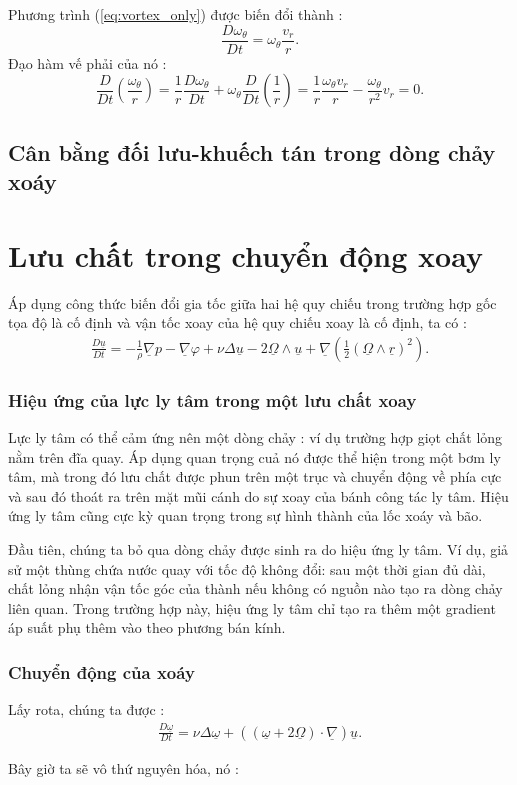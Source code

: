 \documentclass[CO_LUU_CHAT.tex]{subfiles}
\begin{document}
Phương trình (\ref{eq:vortex_only}) được biến đổi thành :
$$
\frac{D\omega_\theta}{Dt}=\omega_\theta\frac{v_r}{r}.
$$
Đạo hàm vế phải của nó :
$$
\frac{D}{Dt}\left(\frac{\omega_\theta}{r}\right)=\frac{1}{r}\frac{D\omega_\theta}{Dt}+\omega_\theta\frac{D}{Dt}\left(\frac{1}{r}\right)=\frac{1}{r}\frac{\omega_\theta v_r}{r}-\frac{\omega_\theta}{r^2}v_r=0.
$$

\subsection{Cân bằng đối lưu-khuếch tán trong dòng chảy xoáy}


\section{Lưu chất trong chuyển động xoay}
	Áp dụng công thức biến đổi gia tốc giữa hai hệ quy chiếu trong trường hợp gốc tọa độ là cố định và vận tốc xoay của hệ quy chiếu xoay là cố định, ta có :
		\begin{equation}
			\begin{aligned}
				\frac{D\underline{u}}{Dt}=-\frac{1}{\rho}\underline{\nabla}p-\underline{\nabla}\varphi+\nu\Delta\underline{u}-2\underline{\Omega}\wedge\underline{u}+\underline{\nabla}\left(\frac{1}{2}\left(\underline{\Omega}\wedge\underline{r}\right)^2\right).
			\end{aligned}
		\end{equation}

\subsubsection{Hiệu ứng của lực ly tâm trong một lưu chất xoay}

	Lực ly tâm có thể cảm ứng nên một dòng chảy : ví dụ trường hợp giọt chất lỏng nằm trên đĩa quay. Áp dụng quan trọng cuả nó được thể hiện trong một bơm ly tâm, mà trong đó lưu chất được phun trên một trục và chuyển động về phía cực và sau đó thoát ra trên mặt mũi cánh do sự xoay của bánh công tác ly tâm. Hiệu ứng ly tâm cũng cực kỳ quan trọng trong sự hình thành của lốc xoáy và bão.

	Đầu tiên, chúng ta bỏ qua dòng chảy được sinh ra do hiệu ứng ly tâm. Ví dụ, giả sử một thùng chứa nước quay với tốc độ không đổi: sau một thời gian đủ dài, chất lỏng nhận vận tốc góc của thành nếu không có nguồn nào tạo ra dòng chảy liên quan. Trong trường hợp này, hiệu ứng ly tâm chỉ tạo ra thêm một gradient áp suất phụ thêm vào theo phương bán kính.

\subsubsection{Chuyển động của xoáy}
	Lấy rota, chúng ta được :
		\begin{equation}
			\begin{aligned}
				\frac{D\underline{\omega}}{Dt}=\nu\Delta\underline{\omega}+\left(\left(\underline{\omega}+2\underline{\Omega}\right)\cdot\underline{\nabla}\right)\underline{u}.
			\end{aligned}
		\end{equation}

Bây giờ ta sẽ vô thứ nguyên hóa, nó :
\end{document}
